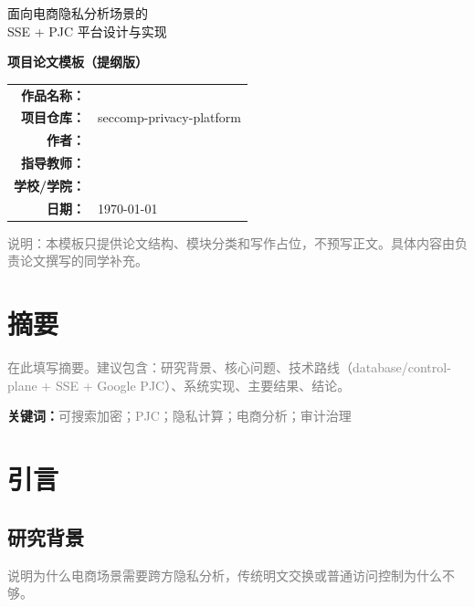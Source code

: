 \documentclass[UTF8,a4paper,12pt,oneside]{ctexrep}
\newcommand{\project}{seccomp-privacy-platform}
\newcommand{\placeholder}[1]{\textcolor{gray}{#1}}
\begin{document}
\begin{titlepage}
  \centering
  \vspace*{1.5cm}
  {\heiti 面向电商隐私分析场景的\\[0.3em]SSE + PJC 平台设计与实现\par}
  \vspace{1.2cm}
  {\bfseries 项目论文模板（提纲版）\par}
  \vspace{2.2cm}
  \begin{tabular}{>{\bfseries}r l}
    作品名称： & \underline{\hspace{7cm}} \\
    项目仓库： & \project \\
    作者： & \underline{\hspace{7cm}} \\
    指导教师： & \underline{\hspace{7cm}} \\
    学校/学院： & \underline{\hspace{7cm}} \\
    日期： & \today \\
  \end{tabular}
  \vfill
  {\placeholder{说明：本模板只提供论文结构、模块分类和写作占位，不预写正文。具体内容由负责论文撰写的同学补充。}\par}
\end{titlepage}


\chapter*{摘要}
\placeholder{在此填写摘要。建议包含：研究背景、核心问题、技术路线（database/control-plane + SSE + Google PJC）、系统实现、主要结果、结论。}

\vspace{1em}
\noindent\textbf{关键词：}\placeholder{可搜索加密；PJC；隐私计算；电商分析；审计治理}

\tableofcontents
\clearpage
{}

\chapter{引言}

\section{研究背景}
\placeholder{说明为什么电商场景需要跨方隐私分析，传统明文交换或普通访问控制为什么不够。}
\end{document}
